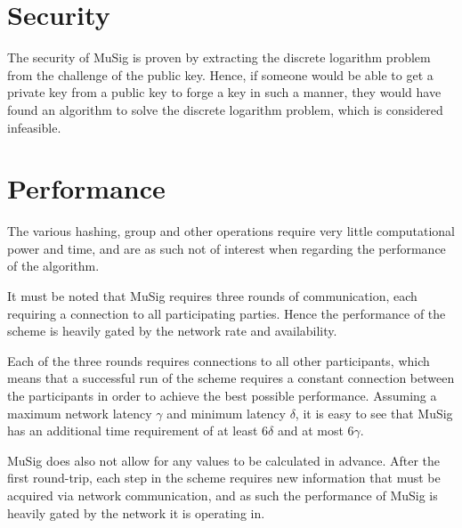 \section{Security}
The security of MuSig is proven by extracting the discrete logarithm problem from the challenge of the public key. Hence, if someone would be able to get a private key from a public key to forge a key in such a manner, they would have found an algorithm to solve the discrete logarithm problem, which is considered infeasible.

\section{Performance}
The various hashing, group and other operations require very little computational power and time, and are as such not of interest when regarding the performance of the algorithm.

It must be noted that MuSig requires three rounds of communication, each requiring a connection to all participating parties. Hence the performance of the scheme is heavily gated by the network rate and availability.

Each of the three rounds requires connections to all other participants, which means that a successful run of the scheme requires a constant connection between the participants in order to achieve the best possible performance. Assuming a maximum network latency $\gamma$ and minimum latency $\delta$, it is easy to see that MuSig has an additional time requirement of at least $6\delta$ and at most $6\gamma$.

MuSig does also not allow for any values to be calculated in advance. After the first round-trip, each step in the scheme requires new information that must be acquired via network communication, and as such the performance of MuSig is heavily gated by the network it is operating in.